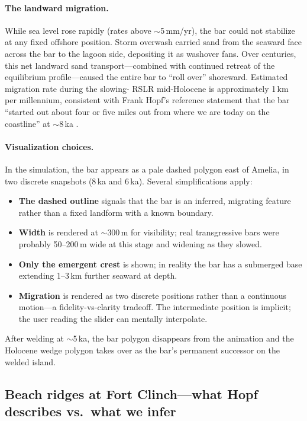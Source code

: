 \documentclass[11pt]{article}
\begin{document}
\paragraph{The landward migration.}
While sea level rose rapidly (rates above $\sim$5\,mm/yr), the bar could
not stabilize at any fixed offshore position. Storm overwash carried sand
from the seaward face across the bar to the lagoon side, depositing it as
washover fans. Over centuries, this net landward sand transport---combined
with continued retreat of the equilibrium profile---caused the entire bar
to ``roll over'' shoreward. Estimated migration rate during the slowing-
RSLR mid-Holocene is approximately 1\,km per millennium, consistent with
Frank Hopf's reference statement that the bar ``started out about four or
five miles out from where we are today on the coastline'' at $\sim$8\,ka
\cite{cn_dunes1}.

\paragraph{Visualization choices.}
In the simulation, the bar appears as a pale dashed polygon east of
Amelia, in two discrete snapshots (8\,ka and 6\,ka). Several
simplifications apply:

\begin{itemize}[leftmargin=2em]
\item \textbf{The dashed outline} signals that the bar is an inferred,
migrating feature rather than a fixed landform with a known boundary.
\item \textbf{Width} is rendered at $\sim$300\,m for visibility; real
transgressive bars were probably 50--200\,m wide at this stage and
widening as they slowed.
\item \textbf{Only the emergent crest} is shown; in reality the bar has
a submerged base extending 1--3\,km further seaward at depth.
\item \textbf{Migration} is rendered as two discrete positions rather
than a continuous motion---a fidelity-vs-clarity tradeoff. The
intermediate position is implicit; the user reading the slider can
mentally interpolate.
\end{itemize}

After welding at $\sim$5\,ka, the bar polygon disappears from the
animation and the Holocene wedge polygon takes over as the bar's
permanent successor on the welded island.

\subsection{Beach ridges at Fort Clinch---what Hopf describes
vs.\ what we infer}
\end{document}
